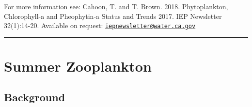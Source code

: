 \documentclass[
]{book}
\begin{document}
\begin{disclaimer}
For more information see: Cahoon, T. and T. Brown. 2018. Phytoplankton,
Chlorophyll-a and Pheophytin-a Status and Trends 2017. IEP Newsletter
32(1):14-20. Available on request:
\href{mailto:iepnewsletter@water.ca.gov}{\nolinkurl{iepnewsletter@water.ca.gov}}
\end{disclaimer}

\begin{center}\rule{0.5\linewidth}{0.5pt}\end{center}

\hypertarget{summer-zooplankton}{%
\section{Summer Zooplankton}\label{summer-zooplankton}}

\hypertarget{background-3}{%
\subsection{Background}\label{background-3}}
\end{document}
